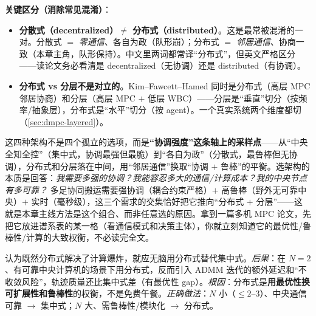 \textbf{关键区分（消除常见混淆）}：
\begin{itemize}
  \item \textbf{分散式（decentralized）$\neq$ 分布式（distributed）}。这是最常被混淆的一对。分散式 $=$ \emph{零通信}、各自为政（队形崩）；分布式 $=$ \emph{邻居通信}、协商一致（本章主角，队形保持）。中文里两词都常译“分布式”，但英文严格区分——读论文务必看清是 decentralized（无协调）还是 distributed（有协调）。
  \item \textbf{分布式 vs 分层不是对立的}。Kim--Fawcett--Hamed 同时是分布式（高层 MPC 邻居协商）和分层（高层 MPC $+$ 低层 WBC）——分层是“垂直”切分（按频率/抽象层），分布式是“水平”切分（按 agent）。一个真实系统两个维度都切（\cref{sec:dmpc-layered}）。
\end{itemize}

\begin{insight}\label{ins:dmpc-coordination-axis}
这四种架构不是四个孤立的选项，而是\textbf{“协调强度”这条轴上的采样点}——从“中央全知全控”（集中式，协调最强但最脆）到“各自为政”（分散式，最鲁棒但无协调），分布式和分层落在中间，用“邻居通信”换取“协调 $+$ 鲁棒”的平衡。选架构的本质是回答：\emph{我需要多强的协调？我能容忍多大的通信/计算成本？我的中央节点有多可靠？} 多足协同搬运需要强协调（耦合约束严格）$+$ 高鲁棒（野外无可靠中央）$+$ 实时（毫秒级），这三个需求的交集恰好把它推向“分布式 $+$ 分层”——这就是本章主线方法是这个组合、而非任意选的原因。拿到一篇多机 MPC 论文，先把它放进谱系表的某一格（看通信模式和决策主体），你就立刻知道它的最优性/鲁棒性/计算的大致权衡，不必读完全文。
\end{insight}

\begin{pitfall}
认为既然分布式解决了计算爆炸，就应无脑用分布式替代集中式。\emph{后果}：在 $N=2$、有可靠中央计算机的场景下用分布式，反而引入 ADMM 迭代的额外延迟和“不收敛风险”，轨迹质量还比集中式差（有最优性 gap）。\emph{根因}：分布式是\textbf{用最优性换可扩展性和鲁棒性}的权衡，不是免费午餐。\emph{正确做法}：$N$ 小（$\le2$–$3$）、中央通信可靠 $\to$ 集中式；$N$ 大、需鲁棒性/模块化 $\to$ 分布式。
\end{pitfall}

